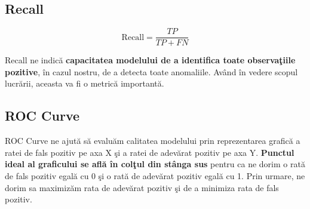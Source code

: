 \subsection{Recall}

\begin{equation}
    \text{Recall} = \frac{TP}{TP + FN}
\end{equation}

Recall ne indică 
\textbf{capacitatea modelului de a identifica toate observaţiile pozitive},
în cazul nostru, de a detecta toate anomaliile. Având în vedere scopul lucrării,
aceasta va fi o metrică importantă.

\subsection{ROC Curve}

ROC Curve ne ajută să evaluăm calitatea modelului prin reprezentarea grafică 
a ratei de fals pozitiv pe axa X şi a ratei de adevărat pozitiv pe axa Y. 
\textbf{Punctul 
ideal al graficului se află în colţul din stânga sus} pentru ca ne dorim o 
rată de fals pozitiv egală cu 0 şi o rată de adevărat pozitiv egală cu 1. Prin urmare,
ne dorim sa maximizăm rata de adevărat pozitiv şi de a minimiza rata de fals pozitiv.
